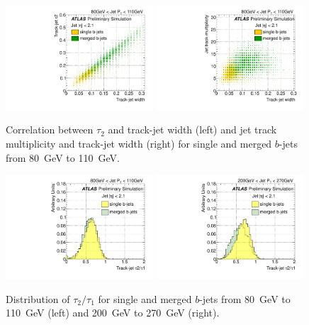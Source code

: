 \begin{figure}[tp]
\centering
\includegraphics[width=0.49\textwidth]{FIGS/VarsSingleMerged/Tau2trkWidth080.pdf}
\includegraphics[width=0.49\textwidth]{FIGS/VarsSingleMerged/NtrktrkWidth080.pdf}
\caption{Correlation between $\tau _2$ and track-jet width (left) and jet track multiplicity and track-jet width (right) for single and merged $b$-jets from 80~GeV to 110~GeV. }
\label{fig:tau2trkwidthsinglemerged}
\end{figure}

\begin{figure}[tp]
\centering
\includegraphics[width=0.49\textwidth]{FIGS/VarsSingleMerged/TauRatio080.pdf}
\includegraphics[width=0.49\textwidth]{FIGS/VarsSingleMerged/TauRatio200.pdf}
\caption{Distribution of $\tau_2/\tau_1$ for single and merged $b$-jets from 80~GeV to 110~GeV (left) and 200~GeV to 270~GeV (right).}
\label{fig:tauratiosinglemerged}
\end{figure}



